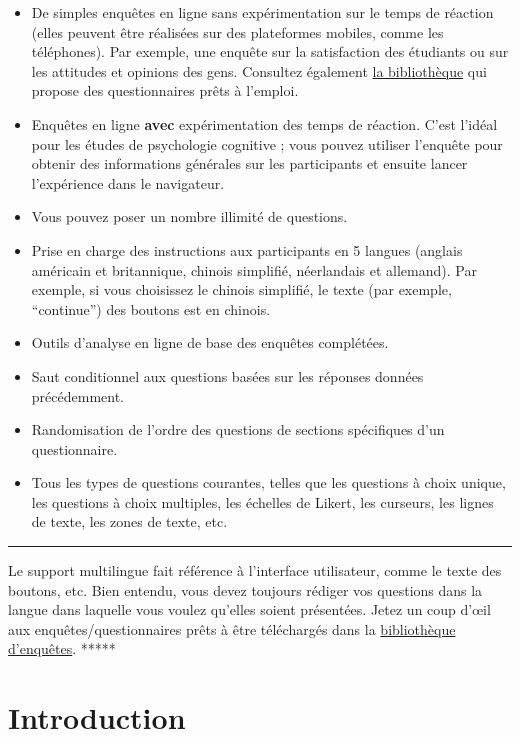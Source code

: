\documentclass[
]{book}
\providecommand{\tightlist}{%
  \setlength{\itemsep}{0pt}\setlength{\parskip}{0pt}}
\begin{document}
\begin{itemize}
\tightlist
\item
  De simples enquêtes en ligne sans expérimentation sur le temps de
  réaction (elles peuvent être réalisées sur des plateformes mobiles,
  comme les téléphones). Par exemple, une enquête sur la satisfaction
  des étudiants ou sur les attitudes et opinions des gens. Consultez
  également \href{http://www.psytoolkit.org/survey-library/}{la
  bibliothèque} qui propose des questionnaires prêts à l'emploi.
\item
  Enquêtes en ligne \textbf{avec} expérimentation des temps de réaction.
  C'est l'idéal pour les études de psychologie cognitive ; vous pouvez
  utiliser l'enquête pour obtenir des informations générales sur les
  participants et ensuite lancer l'expérience dans le navigateur.
\item
  Vous pouvez poser un nombre illimité de questions.
\item
  Prise en charge des instructions aux participants en 5 langues
  (anglais américain et britannique, chinois simplifié, néerlandais et
  allemand). Par exemple, si vous choisissez le chinois simplifié, le
  texte (par exemple, ``continue'') des boutons est en chinois.
\item
  Outils d'analyse en ligne de base des enquêtes complétées.
\item
  Saut conditionnel aux questions basées sur les réponses données
  précédemment.
\item
  Randomisation de l'ordre des questions de sections spécifiques d'un
  questionnaire.
\item
  Tous les types de questions courantes, telles que les questions à
  choix unique, les questions à choix multiples, les échelles de Likert,
  les curseurs, les lignes de texte, les zones de texte, etc.
\end{itemize}

\begin{center}\rule{0.5\linewidth}{\linethickness}\end{center}

Le support multilingue fait référence à l'interface utilisateur, comme
le texte des boutons, etc. Bien entendu, vous devez toujours rédiger vos
questions dans la langue dans laquelle vous voulez qu'elles soient
présentées. Jetez un coup d'œil aux enquêtes/questionnaires prêts à être
téléchargés dans la
\href{http://www.psytoolkit.org/survey-library/}{bibliothèque
d'enquêtes}. *****

\hypertarget{s7-1}{%
\section{Introduction}\label{s7-1}}
\end{document}
